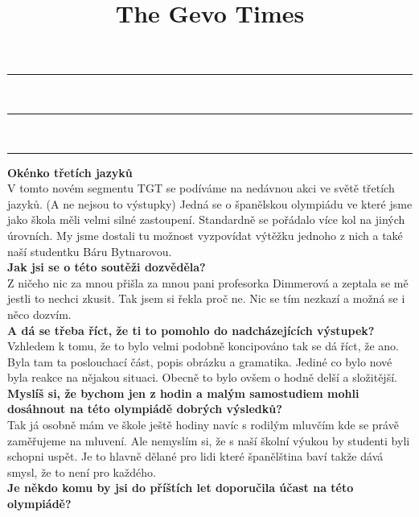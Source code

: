 \documentclass[a4paper]{article}
\title{The Gevo Times}
\begin{document}
\sffamily
\noindent
{\color{gray} \rule{\linewidth}{1pt}} \\[-0.5\baselineskip]
\noindent
{\color{black} \rule{\linewidth}{3pt}} \\[-0.65\baselineskip]
\noindent
{\color{gray} \rule{\linewidth}{1pt}}
 
\begin{multicols}{2}
	\setlength{\columnseprule}{1pt}
	

{\LARGE \textbf{Okénko třetích jazyků}}\\

V tomto novém segmentu TGT se podíváme na  nedávnou akci ve světě třetích jazyků. (A ne  nejsou to výstupky) Jedná se o španělskou  olympiádu ve které jsme jako škola měli velmi  silné zastoupení. Standardně se pořádalo více  kol na jiných úrovních. My jsme dostali tu  možnost vyzpovídat výtěžku jednoho z nich a  také naší studentku Báru Bytnarovou.\\

{\Large \textbf{Jak jsi se o této soutěži dozvěděla?}}\\

Z ničeho nic za mnou přišla za mnou pani 
profesorka Dimmerová a zeptala se mě jestli to 
nechci zkusit. Tak jsem si řekla proč ne. Nic se 
tím nezkazí a možná se i něco dozvím.\\

{\Large \textbf{A dá se třeba říct, že ti to pomohlo do nadcházejících 
výstupek?}}\\

Vzhledem k tomu, že to bylo velmi podobně
koncipováno tak se dá říct, že ano. Byla tam ta 
poslouchací část, popis obrázku a gramatika. 
Jediné co bylo nové byla reakce na nějakou 
situaci. Obecně to bylo ovšem o hodně delší a 
složitější.\\

{\Large \textbf{Myslíš si, že bychom jen z hodin a malým 
samostudiem mohli dosáhnout na této olympiádě
dobrých výsledků?}}\\

Tak já osobně mám ve škole ještě hodiny navíc s 
rodilým mluvčím kde se právě zaměřujeme na 
mluvení. Ale nemyslím si, že s naší školní výukou 
by studenti byli schopni uspět. Je to hlavně
dělané pro lidi které španělština baví takže dává 
smysl, že to není pro každého.\\

{\Large \textbf{Je někdo komu by jsi do příštích let doporučila účast 
na této olympiádě?}}\\


\end{multicols}
\end{document}
